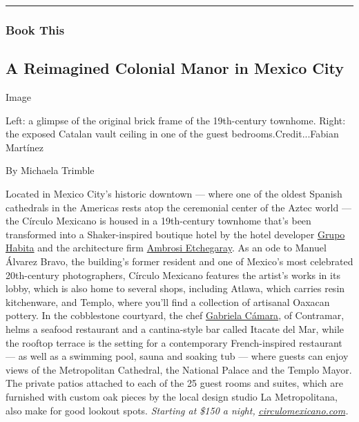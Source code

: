 \begin{center}\rule{0.5\linewidth}{\linethickness}\end{center}

\hypertarget{book-this}{%
\subsubsection{Book This}\label{book-this}}

\hypertarget{a-reimagined-colonial-manor-in-mexico-city}{%
\subsection{A Reimagined Colonial Manor in Mexico
City}\label{a-reimagined-colonial-manor-in-mexico-city}}

Image

Left: a glimpse of the original brick frame of the 19th-century
townhome. Right: the exposed Catalan vault ceiling in one of the guest
bedrooms.Credit...Fabian Martínez

By Michaela Trimble

Located in Mexico City's historic downtown --- where one of the oldest
Spanish cathedrals in the Americas rests atop the ceremonial center of
the Aztec world --- the Círculo Mexicano is housed in a 19th-century
townhome that's been transformed into a Shaker-inspired boutique hotel
by the hotel developer
\href{https://www.nytimes3xbfgragh.onion/2013/02/24/travel/not-your-average-hostels.html}{Grupo
Habita} and the architecture firm
\href{http://ambrosietchegaray.com/}{Ambrosi Etchegaray}. As an ode to
Manuel Álvarez Bravo, the building's former resident and one of Mexico's
most celebrated 20th-century photographers, Círculo Mexicano features
the artist's works in its lobby, which is also home to several shops,
including Atlawa, which carries resin kitchenware, and Templo, where
you'll find a collection of artisanal Oaxacan pottery. In the
cobblestone courtyard, the chef
\href{https://www.nytimes3xbfgragh.onion/2019/06/04/dining/gabriela-camara-mexican-food.html}{Gabriela
Cámara}, of Contramar, helms a seafood restaurant and a cantina-style
bar called Itacate del Mar, while the rooftop terrace is the setting for
a contemporary French-inspired restaurant --- as well as a swimming
pool, sauna and soaking tub --- where guests can enjoy views of the
Metropolitan Cathedral, the National Palace and the Templo Mayor. The
private patios attached to each of the 25 guest rooms and suites, which
are furnished with custom oak pieces by the local design studio La
Metropolitana, also make for good lookout spots. \emph{Starting at \$150
a night,}
\href{https://www.circulomexicano.com/en/}{\emph{circulomexicano.com}}\emph{.}

